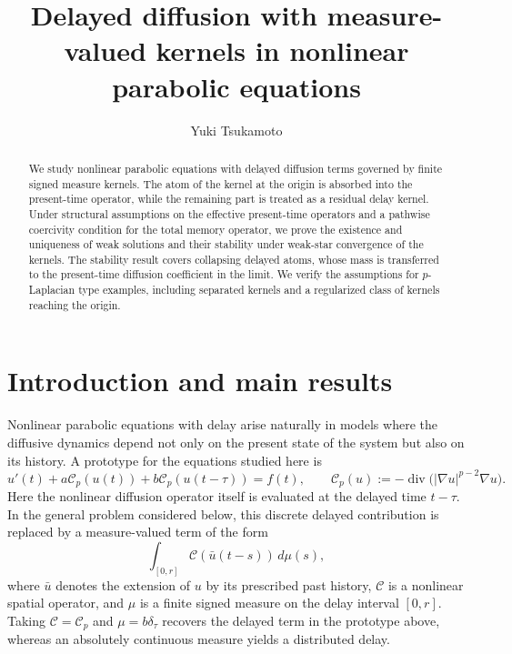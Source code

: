 \documentclass[a4paper,11pt,oneside,reqno]{amsart}
\newcounter{c}
\newcounter{d}
\newcounter{b}
\begin{document}
\title[Delayed diffusion with measure-valued kernels]{Delayed diffusion with measure-valued kernels in nonlinear parabolic equations}
\author{Yuki Tsukamoto}
\date{}

\address{Tokyo University of Science, 162-8601, Tokyo, Japan}

\begin{abstract}
We study nonlinear parabolic equations with delayed diffusion terms governed
by finite signed measure kernels. The atom of the kernel at the origin is
absorbed into the present-time operator, while the remaining part is treated
as a residual delay kernel. Under structural assumptions on the effective
present-time operators and a pathwise coercivity condition for the total
memory operator, we prove the existence and uniqueness of weak solutions and
their stability under weak-star convergence of the kernels. The stability
result covers collapsing delayed atoms, whose mass is transferred to the
present-time diffusion coefficient in the limit. We verify the assumptions
for \(p\)-Laplacian type examples, including separated kernels and a
regularized class of kernels reaching the origin.
\end{abstract}

\maketitle

\section{Introduction and main results}

Nonlinear parabolic equations with delay arise naturally in models where the
diffusive dynamics depend not only on the present state of the system but
also on its history. A prototype for the equations studied here is
\[
  u'(t)
  +a\mathcal C_p(u(t))
  +b\mathcal C_p(u(t-\tau))
  =f(t),
  \qquad
  \mathcal C_p(u)
  :=
  -\operatorname{div}
  \bigl(|\nabla u|^{p-2}\nabla u\bigr).
\]
Here the nonlinear diffusion operator itself is evaluated at the delayed
time \(t-\tau\). In the general problem considered below, this discrete
delayed contribution is replaced by a measure-valued term of the form
\[
  \int_{[0,r]}
  \mathcal C(\bar u(t-s))\,d\mu(s),
\]
where \(\bar u\) denotes the extension of \(u\) by its prescribed past
history, \(\mathcal C\) is a nonlinear spatial operator, and \(\mu\) is a
finite signed measure on the delay interval \([0,r]\). Taking
\(\mathcal C=\mathcal C_p\) and \(\mu=b\delta_\tau\) recovers the delayed
term in the prototype above, whereas an absolutely continuous measure yields
a distributed delay.
\end{document}
